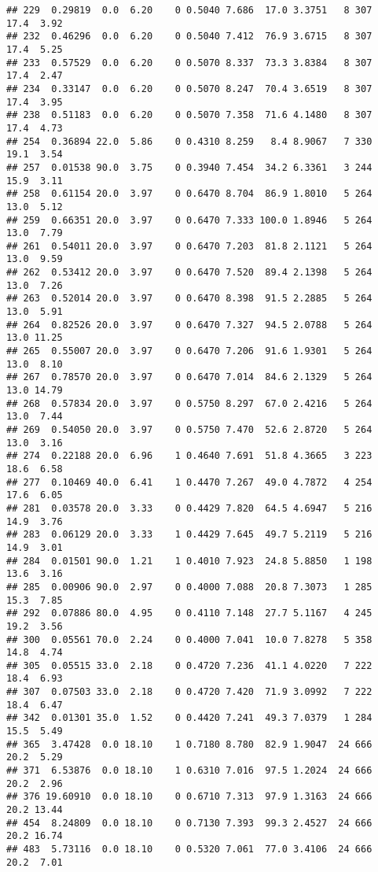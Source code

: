 \documentclass[
]{article}
\begin{document}
\begin{verbatim}
## 229  0.29819  0.0  6.20    0 0.5040 7.686  17.0 3.3751   8 307    17.4  3.92
## 232  0.46296  0.0  6.20    0 0.5040 7.412  76.9 3.6715   8 307    17.4  5.25
## 233  0.57529  0.0  6.20    0 0.5070 8.337  73.3 3.8384   8 307    17.4  2.47
## 234  0.33147  0.0  6.20    0 0.5070 8.247  70.4 3.6519   8 307    17.4  3.95
## 238  0.51183  0.0  6.20    0 0.5070 7.358  71.6 4.1480   8 307    17.4  4.73
## 254  0.36894 22.0  5.86    0 0.4310 8.259   8.4 8.9067   7 330    19.1  3.54
## 257  0.01538 90.0  3.75    0 0.3940 7.454  34.2 6.3361   3 244    15.9  3.11
## 258  0.61154 20.0  3.97    0 0.6470 8.704  86.9 1.8010   5 264    13.0  5.12
## 259  0.66351 20.0  3.97    0 0.6470 7.333 100.0 1.8946   5 264    13.0  7.79
## 261  0.54011 20.0  3.97    0 0.6470 7.203  81.8 2.1121   5 264    13.0  9.59
## 262  0.53412 20.0  3.97    0 0.6470 7.520  89.4 2.1398   5 264    13.0  7.26
## 263  0.52014 20.0  3.97    0 0.6470 8.398  91.5 2.2885   5 264    13.0  5.91
## 264  0.82526 20.0  3.97    0 0.6470 7.327  94.5 2.0788   5 264    13.0 11.25
## 265  0.55007 20.0  3.97    0 0.6470 7.206  91.6 1.9301   5 264    13.0  8.10
## 267  0.78570 20.0  3.97    0 0.6470 7.014  84.6 2.1329   5 264    13.0 14.79
## 268  0.57834 20.0  3.97    0 0.5750 8.297  67.0 2.4216   5 264    13.0  7.44
## 269  0.54050 20.0  3.97    0 0.5750 7.470  52.6 2.8720   5 264    13.0  3.16
## 274  0.22188 20.0  6.96    1 0.4640 7.691  51.8 4.3665   3 223    18.6  6.58
## 277  0.10469 40.0  6.41    1 0.4470 7.267  49.0 4.7872   4 254    17.6  6.05
## 281  0.03578 20.0  3.33    0 0.4429 7.820  64.5 4.6947   5 216    14.9  3.76
## 283  0.06129 20.0  3.33    1 0.4429 7.645  49.7 5.2119   5 216    14.9  3.01
## 284  0.01501 90.0  1.21    1 0.4010 7.923  24.8 5.8850   1 198    13.6  3.16
## 285  0.00906 90.0  2.97    0 0.4000 7.088  20.8 7.3073   1 285    15.3  7.85
## 292  0.07886 80.0  4.95    0 0.4110 7.148  27.7 5.1167   4 245    19.2  3.56
## 300  0.05561 70.0  2.24    0 0.4000 7.041  10.0 7.8278   5 358    14.8  4.74
## 305  0.05515 33.0  2.18    0 0.4720 7.236  41.1 4.0220   7 222    18.4  6.93
## 307  0.07503 33.0  2.18    0 0.4720 7.420  71.9 3.0992   7 222    18.4  6.47
## 342  0.01301 35.0  1.52    0 0.4420 7.241  49.3 7.0379   1 284    15.5  5.49
## 365  3.47428  0.0 18.10    1 0.7180 8.780  82.9 1.9047  24 666    20.2  5.29
## 371  6.53876  0.0 18.10    1 0.6310 7.016  97.5 1.2024  24 666    20.2  2.96
## 376 19.60910  0.0 18.10    0 0.6710 7.313  97.9 1.3163  24 666    20.2 13.44
## 454  8.24809  0.0 18.10    0 0.7130 7.393  99.3 2.4527  24 666    20.2 16.74
## 483  5.73116  0.0 18.10    0 0.5320 7.061  77.0 3.4106  24 666    20.2  7.01

\end{verbatim}
\end{document}
